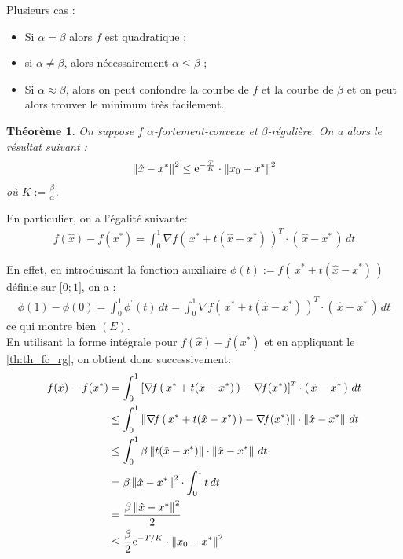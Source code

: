 \documentclass[11pt]{article}
\newcommand{\transpose}[1]{\ensuremath{#1^{\scriptscriptstyle T}}}
\newcommand{\dotpourvariable}{\:\cdot\:}
\newcommand{\ifempty}[3]{\ifx\hfuzz#1\hfuzz #2 \else #3\fi}
\newcommand{\norme}[1]{\left\lVert\ifempty{#1}{\dotpourvariable}{#1}\right\rVert}
\newcommand{\prt}[1]{\left( \, #1  \, \right)}
\newcommand*{\e}{\ensuremath{\mathrm{e}}}
\newcommand{\intervalle}[4]{\mathopen{#1}#2\mathpunct{};#3\mathclose{#4}}
\newcommand{\intff}[2]{\intervalle{[}{#1}{#2}{]}}
\newtheorem{theorem}{Théorème}[section]
\begin{document}
   Plusieurs cas :
   \begin{itemize}
     \item Si $\alpha=\beta$ alors $f$ est quadratique ;
     \item si $\alpha \neq \beta$, alors nécessairement $\alpha \leq \beta$ ;
     \item Si $\alpha \approx \beta$, alors on peut confondre la courbe de $f$ et
     la courbe de $\beta$ et on peut alors trouver le minimum très facilement.
   \end{itemize}

   \begin{theorem}
   \label{th:th_fc_rg}
On suppose $f$ $\alpha$-fortement-convexe et $\beta$-régulière. On a alors le résultat suivant :
\begin{equation*}
\norme{\hat{x} - x^{*}}^2 \leq \e^{-\frac{T}{K}} \cdot \norme{x_0-x^{*}}^2
\end{equation*}
où $K := \frac{\beta}{\alpha}$.
   \end{theorem}

En particulier, on a l'égalité suivante:
\begin{align*}
\tag{E}
  f(\hat{x})- f(x^{*}) = \int_{0}^{1} \transpose{\nabla\! f\prt{x^{*}+t(\hat{x}-x^{*})}}
   \cdot \prt{\hat{x}- x^{*}} \,dt
\end{align*}

En effet, en introduisant la fonction auxiliaire $\phi(t):= f\prt{x^{*}+t(\hat{x}-x^{*})}$ définie sur $\intff{0}{1}$, on a :
\begin{align*}
  \phi(1)-\phi(0)= \int_0^1 \phi^{\prime}(t) \,dt = \int_{0}^{1} \transpose{\nabla\! f\prt{x^{*}+t(\hat{x}-x^{*})}}
   \cdot \prt{\hat{x}- x^{*}} \,dt
\end{align*}
ce qui montre bien $(E)$. \\

En utilisant la forme intégrale pour $f(\hat{x})- f(x^{*})$ et en appliquant le \autoref{th:th_fc_rg}, on obtient donc successivement:
\begin{align*}
f(\hat{x})- f(x^{*}) &= \int_{0}^{1} \left[ \transpose{\nabla\! f\prt{x^{*}+t(\hat{x}-x^{*})}
- \nabla\! f(x^{*})\right]}
 \cdot \prt{\hat{x}- x^{*}} \,dt\\
 &\leq \int_{0}^{1} \norme{\nabla\! f\prt{x^{*}+t(\hat{x}-x^{*})} - \nabla\! f(x^{*})}
  \cdot \norme{\hat{x}- x^{*}} \,dt\\
 &\leq \int_{0}^{1} \beta \norme{t(\hat{x}-x^{*})}
  \cdot \norme{\hat{x}- x^{*}} \,dt\\
 &= \beta \norme{\hat{x}- x^{*}}^2 \cdot \int_{0}^{1} t  \,dt\\
 &= \frac{ \beta \norme{\hat{x}- x^{*}}^2}{2} \\
 &\leq \frac{\beta}{2} \e^{-T/K} \cdot \norme{x_0-x^{*}}^2 \\
\end{align*}
\end{document}
